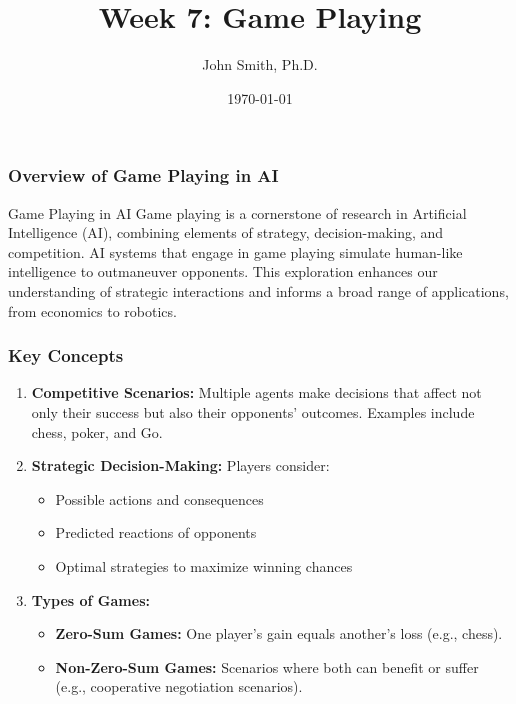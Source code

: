 \documentclass[aspectratio=169]{beamer}
\title[Game Playing]{Week 7: Game Playing}
\author[J. Smith]{John Smith, Ph.D.}
\institute[University Name]{
  Department of Computer Science\\
  University Name\\
  \vspace{0.3cm}
  Email: email@university.edu\\
  Website: www.university.edu
}
\date{\today}
\begin{document}
\frame{\titlepage}

\begin{frame}[fragile]
    \titlepage
\end{frame}

\begin{frame}[fragile]
    \frametitle{Overview of Game Playing in AI}
    \begin{block}{Game Playing in AI}
        Game playing is a cornerstone of research in Artificial Intelligence (AI), combining elements of strategy, decision-making, and competition.  
        AI systems that engage in game playing simulate human-like intelligence to outmaneuver opponents. 
        This exploration enhances our understanding of strategic interactions and informs a broad range of applications, from economics to robotics.
    \end{block}
\end{frame}

\begin{frame}[fragile]
    \frametitle{Key Concepts}
    \begin{enumerate}
        \item \textbf{Competitive Scenarios:} 
        Multiple agents make decisions that affect not only their success but also their opponents' outcomes. Examples include chess, poker, and Go.
        
        \item \textbf{Strategic Decision-Making:} 
        Players consider:
        \begin{itemize}
            \item Possible actions and consequences
            \item Predicted reactions of opponents
            \item Optimal strategies to maximize winning chances
        \end{itemize}
        
        \item \textbf{Types of Games:}
        \begin{itemize}
            \item \textbf{Zero-Sum Games:} One player's gain equals another's loss (e.g., chess).
            \item \textbf{Non-Zero-Sum Games:} Scenarios where both can benefit or suffer (e.g., cooperative negotiation scenarios).
        \end{itemize}
    \end{enumerate}
\end{frame}
\end{document}
